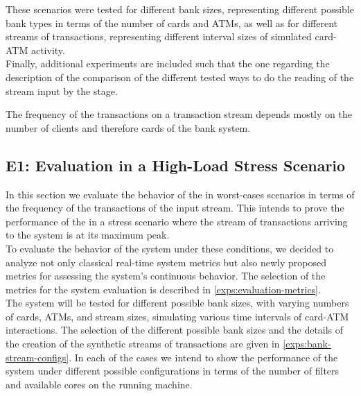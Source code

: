 These scenarios were tested for different bank sizes, representing different possible bank types in terms of the number of cards and ATMs, as well as for different streams of transactions, representing different interval sizes of simulated card-ATM activity.\\

Finally, additional experiments are included such that the one regarding the description of the comparison of the different tested ways to do the reading of the stream input by the \Sr stage.


The frequency of the transactions on a transaction stream depends mostly on the number of clients and therefore cards of the bank system.  

\subsection{E1: Evaluation in a High-Load Stress Scenario}

In this section we evaluate the behavior of the \DPATM in worst-cases scenarios in terms of the frequency of the transactions of the input stream. This intends to prove the performance of the \DPATM in a stress scenario where the stream of transactions arriving to the system is at its maximum peak.\\

To evaluate the behavior of the system under these conditions, we decided to analyze not only classical real-time system metrics but also newly proposed metrics for assessing the system's continuous behavior. The selection of the metrics for the system evaluation is described in \ref{exps:evaluation-metrics}.\\

The system will be tested for different possible bank sizes, with varying numbers of cards, ATMs, and stream sizes, simulating various time intervals of card-ATM interactions. The selection of the different possible bank sizes and the details of the creation of the synthetic streams of transactions are given in \ref{exps:bank-stream-configs}. In each of the cases we intend to show the performance of the system under different possible configurations in terms of the number of filters and available cores on the running machine.

